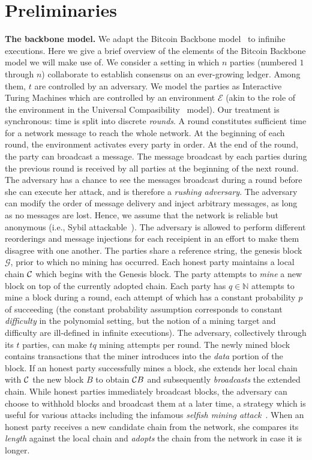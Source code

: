 \section{Preliminaries}

\noindent
\textbf{The backbone model.}
We adapt the Bitcoin Backbone model~\cite{EC:GarKiaLeo15} to infinihe executions. Here we give a brief
overview of the elements of the Bitcoin Backbone model we will make use of.
We consider a setting in which $n$ parties (numbered $1$ through $n$) collaborate to establish consensus on
an ever-growing ledger. Among them, $t$ are controlled by an adversary. We model
the parties as Interactive Turing Machines which are controlled by an
environment $\mathcal{E}$ (akin to the role of the environment in the Universal
Compasibility~\cite{EPRINT:Canetti07} model). Our treatment is synchronous: time
is split into discrete \emph{rounds}. A round constitutes sufficient time for a
network message to reach the whole network. At the beginning of each round, the
environment activates every party in order. At the end of the round, the party
can broadcast a message. The message broadcast by each parties during the
previous round is received by all parties at the beginning of the next round.
The adversary has a chance to see the messages broadcast during a round before
she can execute her attack, and is therefore a \emph{rushing adversary}. The
adversary can modify the order of message delivery and inject arbitrary
messages, as long as no messages are lost. Hence, we assume that the network is
reliable but anonymous (i.e., Sybil attackable~\cite{DBLP:conf/iptps/Douceur02}).
The adversary is allowed to perform different reorderings and message injections
for each receipient in an effort to make them disagree with one another.
The parties share a reference string, the genesis block $\mathcal{G}$, prior to
which no mining has occurred.
Each honest party maintains a local chain $\mathcal{C}$ which begins with the Genesis
block. The party attempts to \emph{mine} a new block on top of the currently
adopted chain. Each party has $q \in \mathbb{N}$ attempts to mine a block during
a round, each attempt of which has a constant probability $p$ of succeeding
(the constant probability assumption corresponds to constant \emph{difficulty}
in the polynomial setting, but the notion of a mining target and difficulty are
ill-defined in infinite executions). The adversary, collectively through its $t$
parties, can make $tq$ mining attempts per round.
The newly mined block contains transactions that the miner introduces into the
\emph{data} portion of the block. If an honest party successfully mines a block,
she extends her local chain with $\mathcal{C}$ the new block $B$ to obtain $\mathcal{C} B$
and subsequently \emph{broadcasts} the extended chain. While honest parties
immediately broadcast blocks, the adversary can choose
to withhold blocks and broadcast them at a later time, a strategy which is
useful for various attacks including the infamous
\emph{selfish mining attack}~\cite{FC:EyaSir14}. When an honest party receives a
new candidate chain from the network, she compares its \emph{length} against the
local chain and \emph{adopts} the chain from the network in case it is longer.

